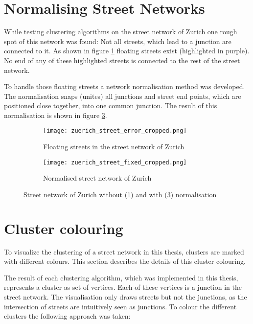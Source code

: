 \pagebreak
\section{Normalising Street Networks}
While testing clustering algorithms on the street network of Zurich one rough spot of this network was found: Not all streets, which lead to a junction are connected to it. As shown in figure \ref{fig:zuerich_error} floating streets exist (highlighted in purple). No end of any of these highlighted streets is connected to the rest of the street network.

To handle those floating streets a network normalisation method was developed. The normalisation snaps (unites) all junctions and street end points, which are positioned close together, into one common junction. The result of this normalisation is shown in figure \ref{fig:zuerich_fixed}.

\begin{figure}
    \centering
    \begin{subfigure}[b]{0.8\textwidth}
        \begin{mdframed}[style=mdthight]
            \texttt{[image: zuerich\_street\_error\_cropped.png]}
        \end{mdframed}
        \caption{Floating streets in the street network of Zurich}
        \label{fig:zuerich_error}
    \end{subfigure}
    \par\medskip
    \begin{subfigure}[b]{0.8\textwidth}
        \begin{mdframed}[style=mdthight]
            \texttt{[image: zuerich\_street\_fixed\_cropped.png]}
        \end{mdframed}
        \caption{Normalised street network of Zurich}
        \label{fig:zuerich_fixed}
    \end{subfigure}
    \caption{Street network of Zurich without (\ref{fig:zuerich_error}) and with (\ref{fig:zuerich_fixed}) normalisation}
\end{figure}

\section{Cluster colouring}
To visualize the clustering of a street network in this thesis, clusters are marked with different colours. This section describes the details of this cluster colouring.

The result of each clustering algorithm, which was implemented in this thesis, represents a cluster as set of vertices. Each of these vertices is a junction in the street network. The visualisation only draws streets but not the junctions, as the intersection of streets are intuitively seen as junctions. To colour the different clusters the following approach was taken:

